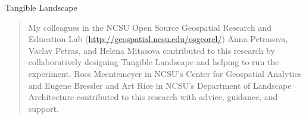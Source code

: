 \documentclass{article}
\begin{document}

\begin{titlepage}
\pagecolor{chaptertitlepagecolor}
\noindent
\color{white}
\large
{\textsf{Tangible Landscape}}\\ 
\makebox[0pt][l]{\rule{1.3\textwidth}{1pt}}
\par
\noindent
\textcolor{chapternamecolor}
{\textsf{}}\vfill
\end{titlepage}
\restoregeometry %
\pagecolor{white}

\begin{titlepage}
\vspace{1em}

\begin{quote}
My colleagues 
in the NCSU Open Source Geospatial Research and Education Lab
(\url{http://geospatial.ncsu.edu/osgeorel/})
Anna Petrasova, Vaclav Petras, and Helena Mitasova
contributed to this research by
collaboratively designing Tangible Landscape and 
helping to run the experiment. 
Ross Meentemeyer in NCSU's Center for Geospatial Analytics and 
Eugene Bressler and Art Rice in NCSU's Department of Landscape Architecture
contributed to this research with advice, guidance, and support.
\end{quote}
\end{titlepage}
\restoregeometry %
\pagecolor{white}
\end{document}
